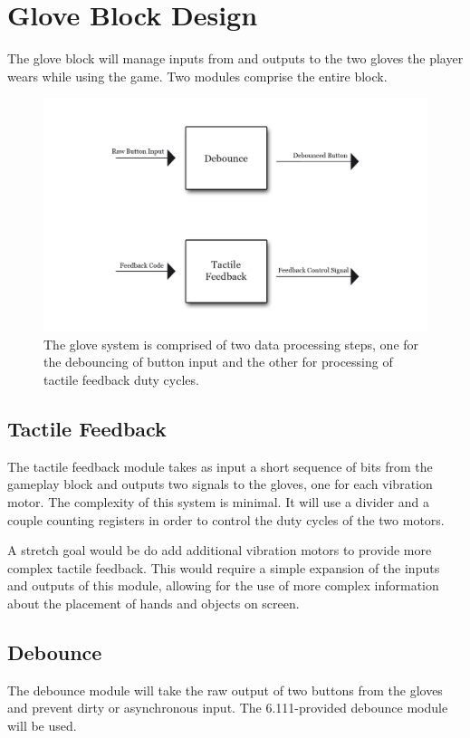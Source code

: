 \section{Glove Block Design}

The glove block will manage inputs from and outputs to the two gloves the player
wears while using the game. Two modules comprise the entire block.

\begin{figure}
\centering
\includegraphics[scale=1]{img/glove.png}
\caption{The glove system is comprised of two data processing steps, one for the
debouncing of button input and the other for processing of tactile feedback duty
cycles.}
\label{fig:glove}
\end{figure}

\subsection{Tactile Feedback}

The tactile feedback module takes as input a short sequence of bits from the
gameplay block and outputs two signals to the gloves, one for each vibration
motor. The complexity of this system is minimal. It will use a divider and a
couple counting registers in order to control the duty cycles of the two motors.

A stretch goal would be do add additional vibration motors to provide more
complex tactile feedback. This would require a simple expansion of the inputs
and outputs of this module, allowing for the use of more complex information
about the placement of hands and objects on screen.

\subsection{Debounce}

The debounce module will take the raw output of two buttons from the gloves and
prevent dirty or asynchronous input. The 6.111-provided debounce module will be
used.
